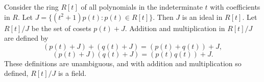 Consider the ring $R[t]$ of all polynomials in the indeterminate $t$ with coefficients in $R$. Let $J = \{(t^2 + 1) p(t) : p(t) \in R[t]\}$. Then $J$ is an ideal in $R[t]$. Let $R[t]/J$ be the set of cosets $p(t) + J$. Addition and multiplication in $R[t]/J$ are defined by
$$(p(t) + J) + (q(t) + J) = (p(t) + q(t)) + J,$$
$$(p(t) + J)(q(t) + J) = (p(t) q(t)) + J.$$
These definitions are unambiguous, and with addition and multiplication so defined, $R[t]/J$ is a field.